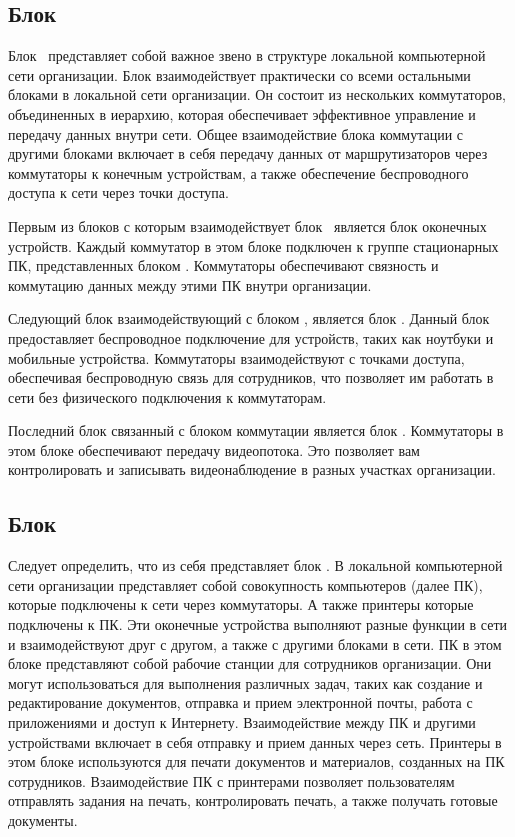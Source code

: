\subsection{Блок \blockSwith}   

Блок \blockSwith\ представляет собой важное звено в структуре локальной компьютерной сети организации. 
Блок взаимодействует практически со всеми остальными блоками в локальной сети организации. 
Он состоит из нескольких коммутаторов, объединенных в иерархию, которая обеспечивает эффективное управление и передачу данных внутри сети. 
Общее взаимодействие блока коммутации с другими блоками включает в себя передачу данных от маршрутизаторов через коммутаторы к конечным 
устройствам, а также обеспечение беспроводного доступа к сети через точки доступа. 

Первым из блоков с которым взаимодействует блок \blockSwith\ является блок оконечных устройств. 
Каждый коммутатор в этом блоке подключен к группе стационарных ПК, представленных блоком \blockDevices\@. 
Коммутаторы обеспечивают связность и коммутацию данных между этими ПК внутри организации.

Следующий блок взаимодействующий с блоком \blockSwith\@, является блок \blockAccessPoint\@. 
Данный блок предоставляет беспроводное подключение для устройств, таких как ноутбуки и мобильные устройства. 
Коммутаторы взаимодействуют с точками доступа, обеспечивая беспроводную связь для сотрудников,
что позволяет им работать в сети без физического подключения к коммутаторам.

Последний блок связанный с блоком коммутации является блок \blockVideo\@. 
Коммутаторы в этом блоке обеспечивают передачу видеопотока. 
Это позволяет вам контролировать и записывать видеонаблюдение в разных участках организации.

\subsection{Блок \blockDevices}   

Следует определить, что из себя представляет блок \blockDevices\@. 
В локальной компьютерной сети организации представляет собой совокупность компьютеров (далее ПК), 
которые подключены к сети через коммутаторы. А также принтеры которые подключены к ПК.
Эти оконечные устройства выполняют разные функции в сети и взаимодействуют друг с другом, а также с другими блоками в сети. 
ПК в этом блоке представляют собой рабочие станции для сотрудников организации. Они могут использоваться для выполнения различных задач, 
таких как создание и редактирование документов, отправка и прием электронной почты, работа с приложениями и доступ к Интернету.
Взаимодействие между ПК и другими устройствами включает в себя отправку и прием данных через сеть.
Принтеры в этом блоке используются для печати документов и материалов, созданных на ПК сотрудников. 
Взаимодействие ПК с принтерами позволяет пользователям отправлять задания на печать, контролировать печать, а также получать готовые документы.

